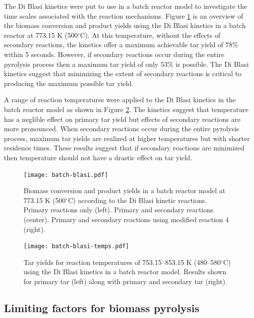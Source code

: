 The Di Blasi kinetics were put to use in a batch reactor model to investigate the time scales associated with the reaction mechanisms. Figure \ref{fig:batch-blasi} is an overview of the biomass conversion and product yields using the Di Blasi kinetics in a batch reactor at 773.15 K (500$^\circ$C). At this temperature, without the effects of secondary reactions, the kinetics offer a maximum achievable tar yield of 78\% within 5 seconds. However, if secondary reactions occur during the entire pyrolysis process then a maximum tar yield of only 53\% is possible. The Di Blasi kinetics suggest that minimizing the extent of secondary reactions is critical to producing the maximum possible tar yield.

A range of reaction temperatures were applied to the Di Blasi kinetics in the batch reactor model as shown in Figure \ref{fig:batch-blasi-temps}. The kinetics suggest that temperature has a neglible effect on primary tar yield but effects of secondary reactions are more pronounced. When secondary reactions occur during the entire pyrolysis process, maximum tar yields are realized at higher temperatures but with shorter residence times. These results suggest that if secondary reactions are minimized then temperature should not have a drastic effect on tar yield.

\begin{figure}[H]
    \centering
    \texttt{[image: batch-blasi.pdf]}
    \caption{Biomass conversion and product yields in a batch reactor model at 773.15 K (500$^\circ$C) according to the Di Blasi kinetic reactions. Primary reactions only (left). Primary and secondary reactions (center). Primary and secondary reactions using modified reaction 4 (right).}
    \label{fig:batch-blasi}
\end{figure}

\begin{figure}[H]
    \centering
    \texttt{[image: batch-blasi-temps.pdf]}
    \caption{Tar yields for reaction temperatures of 753.15--853.15 K (480--580$^\circ$C) using the Di Blasi kinetics in a batch reactor model. Results shown for primary tar (left) along with primary and secondary tar (right).}
    \label{fig:batch-blasi-temps}
\end{figure}


\subsection{Limiting factors for biomass pyrolysis}

